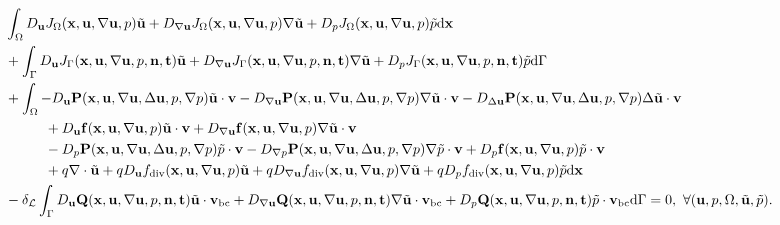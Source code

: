 \documentclass[oneside,11pt]{book}
\numberwithin{equation}{section}
\begin{document}
\begin{align*}
    &\int_\Omega D_{\bf u}J_\Omega({\bf x},{\bf u},\nabla{\bf u},p)\tilde{\bf u} + D_{\nabla{\bf u}}J_\Omega({\bf x},{\bf u},\nabla{\bf u},p)\nabla\tilde{\bf u} + D_pJ_\Omega({\bf x},{\bf u},\nabla{\bf u},p)\tilde{p}{\rm d}{\bf x}\\
    &+ \int_\Gamma D_{\bf u}J_\Gamma({\bf x},{\bf u},\nabla{\bf u},p,{\bf n},{\bf t})\tilde{\bf u} + D_{\nabla{\bf u}}J_\Gamma({\bf x},{\bf u},\nabla{\bf u},p,{\bf n},{\bf t})\nabla\tilde{\bf u} + D_pJ_\Gamma({\bf x},{\bf u},\nabla{\bf u},p,{\bf n},{\bf t})\tilde{p}{\rm d}\Gamma\\
    &+ \int_\Omega -D_{\bf u}{\bf P}({\bf x},{\bf u},\nabla{\bf u},\Delta{\bf u},p,\nabla p)\tilde{\bf u}\cdot{\bf v} - D_{\nabla{\bf u}}{\bf P}({\bf x},{\bf u},\nabla{\bf u},\Delta{\bf u},p,\nabla p)\nabla\tilde{\bf u}\cdot{\bf v} - D_{\Delta{\bf u}}{\bf P}({\bf x},{\bf u},\nabla{\bf u},\Delta{\bf u},p,\nabla p)\Delta\tilde{\bf u}\cdot{\bf v}\\
    &\hspace{1cm} + D_{\bf u}{\bf f}({\bf x},{\bf u},\nabla{\bf u},p)\tilde{\bf u}\cdot{\bf v} + D_{\nabla{\bf u}}{\bf f}({\bf x},{\bf u},\nabla{\bf u},p)\nabla\tilde{\bf u}\cdot{\bf v}\\
    &\hspace{1cm} - D_p{\bf P}({\bf x},{\bf u},\nabla{\bf u},\Delta{\bf u},p,\nabla p)\tilde{p}\cdot{\bf v} - D_{\nabla p}{\bf P}({\bf x},{\bf u},\nabla{\bf u},\Delta{\bf u},p,\nabla p)\nabla\tilde{p}\cdot{\bf v} + D_p{\bf f}({\bf x},{\bf u},\nabla{\bf u},p)\tilde{p}\cdot{\bf v}\\
    &\hspace{1cm} + q\nabla\cdot\tilde{\bf u} + qD_{\bf u}f_{\rm div}({\bf x},{\bf u},\nabla{\bf u},p)\tilde{\bf u} + qD_{\nabla{\bf u}}f_{\rm div}({\bf x},{\bf u},\nabla{\bf u},p)\nabla\tilde{\bf u} + qD_pf_{\rm div}({\bf x},{\bf u},\nabla{\bf u},p)\tilde{p}{\rm d}{\bf x}\\
    &- \delta_{\mathcal{L}}\int_\Gamma D_{\bf u}{\bf Q}({\bf x},{\bf u},\nabla{\bf u},p,{\bf n},{\bf t})\tilde{\bf u}\cdot{\bf v}_{\rm bc} + D_{\nabla{\bf u}}{\bf Q}({\bf x},{\bf u},\nabla{\bf u},p,{\bf n},{\bf t})\nabla\tilde{\bf u}\cdot{\bf v}_{\rm bc} + D_p{\bf Q}({\bf x},{\bf u},\nabla{\bf u},p,{\bf n},{\bf t})\tilde{p}\cdot{\bf v}_{\rm bc}{\rm d}\Gamma = 0,\ \forall({\bf u},p,\Omega,\tilde{\bf u},\tilde{p}).
\end{align*}
\end{document}
